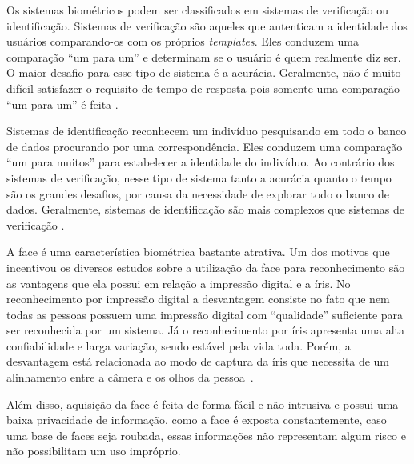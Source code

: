 Os sistemas biométricos podem ser classificados em sistemas de verificação ou identificação. Sistemas de verificação são aqueles que autenticam a identidade dos usuários comparando-os com os próprios \textit{templates}. Eles conduzem uma comparação ``um para um'' e determinam se o usuário é quem realmente diz ser. O maior desafio para esse tipo de sistema é a acurácia. Geralmente, não é muito difícil satisfazer o requisito de tempo de resposta pois somente uma comparação ``um para um'' é feita \cite{hong}.

Sistemas de identificação reconhecem um indivíduo pesquisando em todo o banco de dados procurando por uma correspondência. Eles conduzem uma comparação ``um para muitos'' para estabelecer a identidade do indivíduo. Ao contrário dos sistemas de verificação, nesse tipo de sistema tanto a acurácia quanto o tempo são os grandes desafios, por causa da necessidade de explorar todo o banco de dados. Geralmente, sistemas de identificação são mais complexos que sistemas de verificação \cite{hong}.

A face é uma característica biométrica bastante atrativa. Um dos motivos que incentivou os diversos estudos sobre a utilização da face para reconhecimento são as vantagens que ela possui em relação a impressão digital e a íris.  No reconhecimento por impressão digital a desvantagem consiste no fato que nem todas as pessoas possuem uma impressão digital com ``qualidade'' suficiente para ser reconhecida por um sistema. Já o reconhecimento por íris apresenta uma alta confiabilidade e larga variação, sendo estável pela vida toda. Porém, a desvantagem está relacionada ao modo de captura da íris que necessita de um alinhamento entre a câmera e os olhos da pessoa~\cite{saocarlos}. 

Além disso, aquisição da face é feita de forma fácil e não-intrusiva e possui uma baixa privacidade de informação, como a face é exposta constantemente, caso uma base de faces seja roubada, essas informações não representam algum risco e não possibilitam um uso impróprio.
